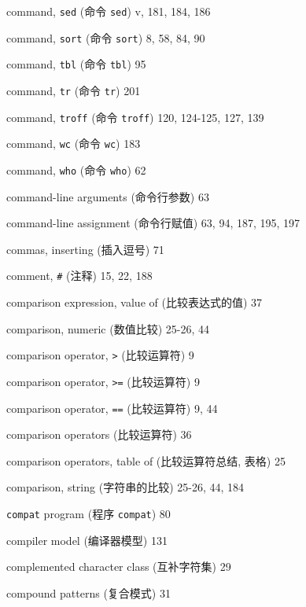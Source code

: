 \begin{multicols}{2}
\hangindent=2pc  command, \verb'sed' (命令 \verb'sed') 
v, 181, 184, 186

\hangindent=2pc  command, \verb'sort' (命令 \verb'sort') 8, 58, 84, 90

\hangindent=2pc  command, \verb'tbl' (命令 \verb'tbl') 95

\hangindent=2pc  command, \verb'tr' (命令 \verb'tr') 201

\hangindent=2pc  command, \verb'troff' (命令 \verb'troff')
120, 124-125, 127, 139

\hangindent=2pc  command, \verb'wc' (命令 \verb'wc') 183


\hangindent=2pc  command, \verb'who' (命令 \verb'who') 62

\hangindent=2pc  command-line arguments (命令行参数) 63

\hangindent=2pc  command-line assignment (命令行赋值)
63, 94, 187, 195, 197

\hangindent=2pc  commas, inserting (插入逗号) 71

\hangindent=2pc  comment, \verb'#' (注释) 15, 22, 188

\hangindent=2pc  comparison expression, value of
(比较表达式的值) 37

\hangindent=2pc  comparison, numeric (数值比较) 25-26, 44

\hangindent=2pc  comparison operator, \verb'>' (比较运算符) 9

\hangindent=2pc  comparison operator, \verb'>=' (比较运算符) 9

\hangindent=2pc  comparison operator, \verb'==' (比较运算符) 9, 44

\hangindent=2pc  comparison operators (比较运算符) 36

\hangindent=2pc  comparison operators, table of (比较运算符总结,
 表格) 25

\hangindent=2pc  comparison, string (字符串的比较) 25-26, 44, 184

\hangindent=2pc  \verb'compat' program (程序 \verb'compat') 80

\hangindent=2pc  compiler model (编译器模型) 131

\hangindent=2pc  complemented character class (互补字符集) 29

\hangindent=2pc  compound patterns (复合模式) 31


\end{multicols}
